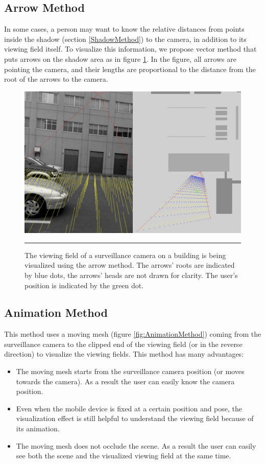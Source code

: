 \subsection{Arrow Method}

In some cases, a person may want to know the relative distances from points inside the shadow (section \ref{ShadowMethod}) to the camera, in addition to its viewing field itself. To visualize this information, we propose vector method that puts arrows on the shadow area as in figure \ref{fig:ArrowMethod}. In the figure, all arrows are pointing the camera, and their lengths are proportional to the distance from the root of the arrows to the camera.

\begin{figure}[htbp]
	\centering
	\includegraphics[width=14cm]{./Primitives/theory_arrow.png}
	\rule{35em}{0.5pt}
	\caption[Arrow method]{The viewing field of a surveillance camera on a building is being visualized using the arrow method. The arrows' roots are indicated by blue dots, the arrows' heads are not drawn for clarity. The user's position is indicated by the green dot.}
	\label{fig:ArrowMethod}
\end{figure}

\subsection{Animation Method}

This method uses a moving mesh (figure \ref{fig:AnimationMethod}) coming from the surveillance camera to the clipped end of the viewing field (or in the reverse direction) to visualize the viewing fields. This method has  many advantages:

\begin{itemize}
	\item The moving mesh starts from the surveillance camera position (or moves towards the camera). As a result the user can easily know the camera position.
	\item Even when the mobile device is fixed at a certain position and pose, the visualization effect is still helpful to understand the viewing field because of its animation.
	\item The moving mesh does not occlude the scene. As a result the user can easily see both the scene and the visualized viewing field at the same time.
\end{itemize}

